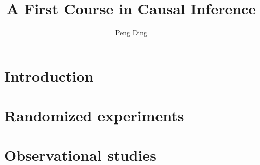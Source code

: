 \documentclass[krantz1]{krantz}
\begin{document}
\frontmatter

\title{A First Course in Causal Inference}
\author{Peng Ding}

\maketitle


\tableofcontents




\mainmatter

\makeatletter
{}
\makeatother

\renewcommand{\theexample}{\thechapter.\arabic{example}}
\renewcommand{\theassumption}{\thechapter.\arabic{assumption}}
\renewcommand{\thelemma}{\thechapter.\arabic{lemma}}
\renewcommand{\thetheorem}{\thechapter.\arabic{theorem}}
\renewcommand{\theremark}{\thechapter.\arabic{remark}}
\renewcommand{\thecondition}{\thechapter.\arabic{condition}}
\renewcommand{\thecorollary}{\thechapter.\arabic{corollary}}
\renewcommand{\theproposition}{\thechapter.\arabic{proposition}}
\renewcommand{\thedefinition}{\thechapter.\arabic{definition}}

\part{Introduction}\label{part::introduction}



\part{Randomized experiments}\label{part::rcts}








\part{Observational studies}\label{part::observational-studies}






\end{document}

